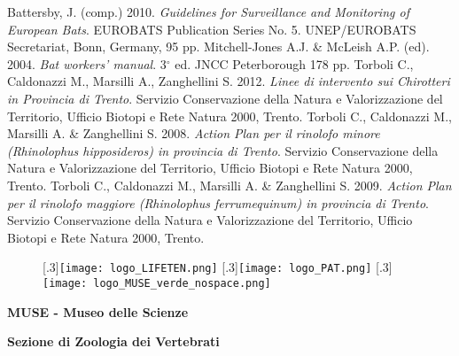 \documentclass[10pt,twoside,openany,x11names,svgnames,italian,a5paper,dvipsnames,table]{memoir}
\begin{document}
\begin{thebibliography}{99}
 Battersby, J. (comp.) 2010. \emph{Guidelines for Surveillance and Monitoring of European Bats}. EUROBATS Publication Series No. 5. UNEP/EUROBATS Secretariat, Bonn, Germany, 95 pp.
 Mitchell-Jones A.J. \& McLeish A.P. (ed). 2004. \emph{Bat workers’ manual}. 3$^\circ$ ed. JNCC Peterborough 178 pp. 
 Torboli C., Caldonazzi M., Marsilli A., Zanghellini S. 2012. \emph{Linee di intervento sui Chirotteri in Provincia di Trento}. Servizio Conservazione della Natura e Valorizzazione del Territorio, Ufficio Biotopi e Rete Natura 2000, Trento.
 Torboli C., Caldonazzi M., Marsilli A. \& Zanghellini S. 2008. \emph{Action Plan per il rinolofo minore (Rhinolophus hipposideros) in provincia di Trento}. Servizio Conservazione della Natura e Valorizzazione del Territorio, Ufficio Biotopi e Rete Natura 2000, Trento.
 Torboli C., Caldonazzi M., Marsilli A. \& Zanghellini S. 2009. \emph{Action Plan per il rinolofo maggiore (Rhinolophus ferrumequinum) in provincia di Trento}. Servizio Conservazione della Natura e Valorizzazione del Territorio, Ufficio Biotopi e Rete Natura 2000, Trento.
\end{thebibliography}


\cleartoverso

\normalsize
\enlargethispage{3\baselineskip}
\thispagestyle{empty}
\pagecolor{Sienna!90!white}
\begin{center}
\vspace*{\fill}

\begin{figure}[htp]
\captionsetup{font=normalsize}
\centering
{}[.3\linewidth]{\texttt{[image: logo\_LIFETEN.png]}}
[.3\linewidth]{\texttt{[image: logo\_PAT.png]}}
[.3\linewidth]{\texttt{[image: logo\_MUSE\_verde\_nospace.png]}}
\end{figure}
\textbf{\textcolor{LightGoldenrod!50!Gold}{MUSE - Museo delle Scienze}}

\vspace*{\baselineskip}

\textbf{\textcolor{LightGoldenrod}{Sezione di Zoologia dei Vertebrati}}
\end{center}
\end{document}
